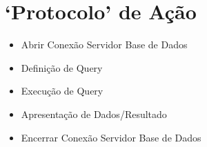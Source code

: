 \section{`Protocolo' de Ação}
 \begin{itemize}
     \item Abrir Conexão Servidor Base de Dados
     \item Definição de Query
     \item Execução de Query
     \item Apresentação de Dados/Resultado
     \item Encerrar Conexão Servidor Base de Dados
 \end{itemize}